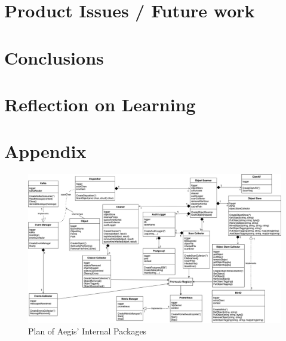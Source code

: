 \documentclass[12pt, conference, final, a4paper, onecolumn, compsoc]{IEEEtran}
\begin{document}
\subsection*{}

\section{Product Issues / Future work} %
\subsection*{}

\section{Conclusions}
\subsection*{}

\section{Reflection on Learning} %
\subsection*{}

\section{Appendix}

\begin{figure}[H]
  \centering \includegraphics[scale=.38]{diagrams/class-diagram.png}
  \caption{Plan of Aegis' Internal Packages}
  \label{appendix:class-diagram}
\end{figure}
\end{document}

